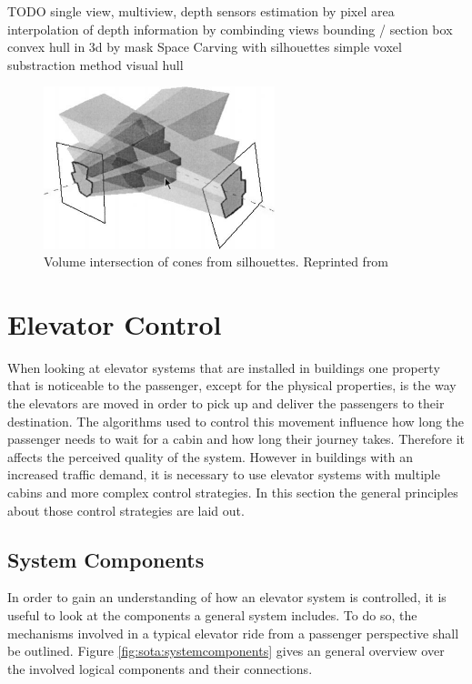 TODO
single view, multiview, depth sensors
estimation by pixel area
interpolation of depth information by combinding views
bounding / section box
convex hull in 3d by mask
Space Carving with silhouettes
simple voxel substraction method
visual hull 



\begin{figure}[hbt]
	\centering
	\includegraphics[width=0.6\textwidth, keepaspectratio]{resources/volume_intersection_bottino}
	\caption{\label{fig:sota:volumeintersection} Volume intersection of cones from silhouettes.
	Reprinted from \textcite[][]{bottino2001silhouette}}
\end{figure}

\section{Elevator Control}

When looking at elevator systems that are installed in buildings
one property that is noticeable to the passenger, except for the physical properties, is the way the elevators are moved in order to pick up and deliver the passengers to their destination.
The algorithms used to control this movement influence how long the passenger needs to wait for a cabin and how long their journey takes.
Therefore it affects the perceived quality of the system.
However in buildings with an increased traffic demand, it is necessary to use elevator systems with multiple cabins and more complex control strategies.
In this section the general principles about those control strategies are laid out.

\subsection{System Components}

In order to gain an understanding of how an elevator system is controlled,
it is useful to look at the components a general system includes.
To do so, the mechanisms involved in a typical elevator ride 
from a passenger perspective shall be outlined.
Figure \ref{fig:sota:systemcomponents} gives an general overview over the involved logical components and their connections.

